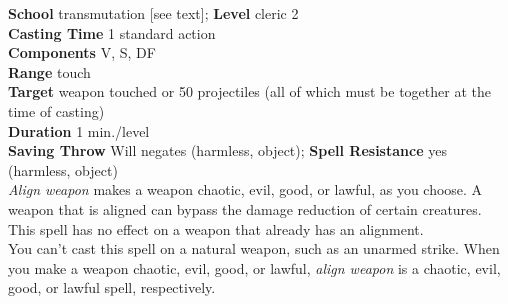 \textbf{School} transmutation [see text]; \textbf{Level} cleric 2\\
\textbf{Casting Time} 1 standard action\\
\textbf{Components} V, S, DF\\
\textbf{Range} touch\\
\textbf{Target }weapon touched or 50 projectiles (all of which must be together at the time of casting)\\
\textbf{Duration} 1 min./level\\
\textbf{Saving Throw }Will negates (harmless, object); \textbf{Spell Resistance} yes (harmless, object)\\
\textit{Align weapon }makes a weapon chaotic, evil, good, or lawful, as you choose. A weapon that is aligned can bypass the damage reduction of certain creatures. This spell has no effect on a weapon that already has an alignment. \\
You can't cast this spell on a natural weapon, such as an unarmed strike. When you make a weapon chaotic, evil, good, or lawful, \textit{align weapon }is a chaotic, evil, good, or lawful spell, respectively.\\
